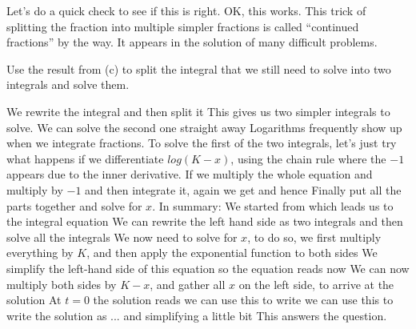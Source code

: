 Let's do a quick check to see if this is right. 
OK, this works. This trick of splitting the fraction into multiple simpler fractions is called ``continued fractions'' by the way. It appears in the solution of many difficult problems. 

\subquestion
Use the result from (c) to split the integral that we still need to solve into two integrals and solve them. 

\solution 
We rewrite the integral
and then split it 
This gives us two simpler integrals to solve. We can solve the second one straight away
Logarithms frequently show up when we integrate fractions. To solve the first of the two integrals, let's just try what happens if we differentiate $log(K-x)$, using the chain rule 
where the $-1$ appears due to the inner derivative. If we multiply the whole equation and multiply by $-1$ and then integrate it, again we get 
and hence 
\subquestion Finally put all the parts together and solve for $x$. 
\solution
In summary: We started from 
which leads us to the integral equation 
We can rewrite the left hand side as two integrals 
and then solve all the integrals
We now need to solve for $x$, to do so, we first multiply everything by $K$,
and then apply the exponential function to both sides
We simplify the left-hand side of this equation 
so the equation reads now 
We can now multiply both sides by $K-x$, 
and gather all $x$ on the left side, 
to arrive at the solution 
At $t=0$ the solution reads 
we can use this to write 
we can use this to write the solution as 
... and simplifying a little bit 
This answers the question. 

